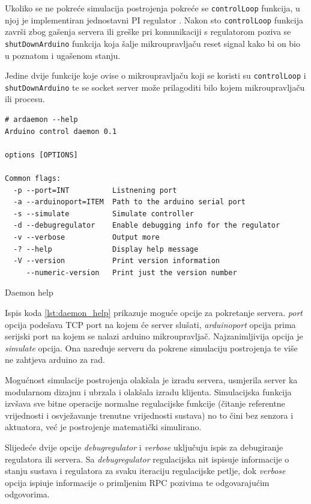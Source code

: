 Ukoliko se ne pokreće simulacija postrojenja pokreće se
\texttt{controlLoop} funkcija, u njoj je implementiran jednostavni
PI regulator \cite[494]{control}. Nakon sto \texttt{controlLoop}
funkcija završi zbog gašenja servera ili greške pri komunikaciji s regulatorom
poziva se \texttt{shutDownArduino} funkcija koja šalje
mikroupravljaču reset signal kako bi on bio u poznatom i ugašenom stanju.

Jedine dvije funkcije koje ovise o mikroupravljaču koji se koristi su
\texttt{controlLoop} i \texttt{shutDownArduino} te se
socket server može prilagoditi bilo kojem mikroupravljaču ili procesu.

\begin{listing}[H]
\centering
\begin{verbatim}
# ardaemon --help
Arduino control daemon 0.1

options [OPTIONS]

Common flags:
  -p --port=INT          Listnening port
  -a --arduinoport=ITEM  Path to the arduino serial port
  -s --simulate          Simulate controller
  -d --debugregulator    Enable debugging info for the regulator
  -v --verbose           Output more
  -? --help              Display help message
  -V --version           Print version information
     --numeric-version   Print just the version number
\end{verbatim}
\caption{Daemon help}
\label{lst:daemon_help}
\end{listing}

Ispis koda \ref{lst:daemon_help} prikazuje moguće opcije za pokretanje servera.
\emph{port} opcija podešava TCP port na kojem će server slušati,
\emph{arduinoport} opcija prima serijski port na kojem se nalazi arduino
mikroupravljač. Najzanimljivija opcija je \emph{simulate} opcija. Ona naređuje
serveru da pokrene simulaciju postrojenja te više ne zahtjeva arduino za rad.

Mogućnost simulacije postrojenja olakšala je izradu servera, usmjerila server ka
modularnom dizajnu i ubrzala i olakšala izradu klijenta. Simulacijska funkcija
izvšava sve bitne operacije normalne regulacijske funkcije (čitanje referentne
vrijednosti i osvježavanje trenutne vrijednosti sustava) no to čini bez senzora
i aktuatora, već je postrojenje matematički simulirano.

Slijedeće dvije opcije \emph{debugregulator} i \emph{verbose} uključuju ispis za
debugiranje regulatora ili servera. Sa \emph{debugregulator} regulacijska nit
ispisuje informacije o stanju sustava i regulatora za svaku iteraciju
regulacijske petlje, dok \emph{verbose} opcija ispiuje informacije o primljenim
RPC pozivima te odgovarajućim odgovorima.

